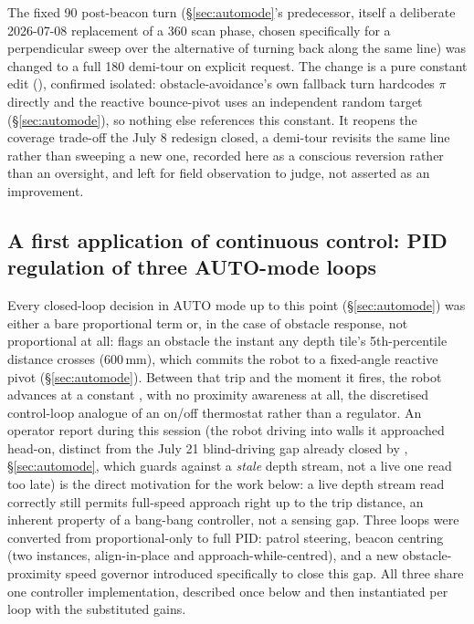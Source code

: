 The fixed 90\textdegree{} post-beacon turn (\S\ref{sec:automode}'s
predecessor, itself a deliberate 2026-07-08 replacement of a
360\textdegree{} scan phase, chosen specifically for a perpendicular sweep
over the alternative of turning back along the same line) was changed to a
full 180\textdegree{} demi-tour on explicit request. The change is a pure
constant edit (), confirmed isolated:
obstacle-avoidance's own fallback turn hardcodes $\pi$ directly and the
reactive bounce-pivot uses an independent random target
(\S\ref{sec:automode}), so nothing else references this constant. It
reopens the coverage trade-off the July 8 redesign closed, a demi-tour
revisits the same line rather than sweeping a new one, recorded here as a
conscious reversion rather than an oversight, and left for field
observation to judge, not asserted as an improvement.

\subsection{A first application of continuous control: PID regulation of three AUTO-mode loops}
\label{sec:pid}
Every closed-loop decision in AUTO mode up to this point (\S\ref{sec:automode})
was either a bare proportional term or, in the case of obstacle response,
not proportional at all:  flags an obstacle the instant
any depth tile's 5th-percentile distance crosses 
(600\,mm), which commits the robot to a fixed-angle reactive pivot
(\S\ref{sec:automode}). Between that trip and the moment it fires, the
robot advances at a constant , with no proximity
awareness at all, the discretised control-loop analogue of an on/off
thermostat rather than a regulator. An operator report during this
session (the robot driving into walls it approached head-on, distinct
from the July 21 blind-driving gap already closed by
, \S\ref{sec:automode}, which guards against a
\emph{stale} depth stream, not a live one read too late) is the direct
motivation for the work below: a live depth stream read correctly still
permits full-speed approach right up to the trip distance, an inherent
property of a bang-bang controller, not a sensing gap. Three loops were
converted from proportional-only to full PID: patrol steering, beacon
centring (two instances, align-in-place and approach-while-centred), and a
new obstacle-proximity speed governor introduced specifically to close
this gap. All three share one controller implementation, described once
below and then instantiated per loop with the substituted gains.

